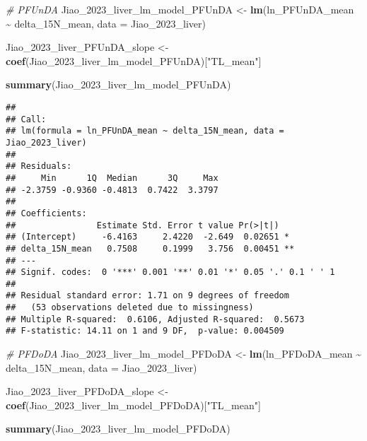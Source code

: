 \documentclass[
]{article}
\newenvironment{Shaded}{\begin{snugshade}}{\end{snugshade}}
\newcommand{\AttributeTok}[1]{\textcolor[rgb]{0.13,0.29,0.53}{#1}}
\newcommand{\CommentTok}[1]{\textcolor[rgb]{0.56,0.35,0.01}{\textit{#1}}}
\newcommand{\FunctionTok}[1]{\textcolor[rgb]{0.13,0.29,0.53}{\textbf{#1}}}
\newcommand{\NormalTok}[1]{#1}
\newcommand{\OtherTok}[1]{\textcolor[rgb]{0.56,0.35,0.01}{#1}}
\newcommand{\SpecialCharTok}[1]{\textcolor[rgb]{0.81,0.36,0.00}{\textbf{#1}}}
\newcommand{\StringTok}[1]{\textcolor[rgb]{0.31,0.60,0.02}{#1}}
\begin{document}
\begin{Shaded}
\begin{Highlighting}[]
\CommentTok{\# PFUnDA}
\NormalTok{Jiao\_2023\_liver\_lm\_model\_PFUnDA }\OtherTok{\textless{}{-}} \FunctionTok{lm}\NormalTok{(ln\_PFUnDA\_mean }\SpecialCharTok{\textasciitilde{}}\NormalTok{ delta\_15N\_mean,}
                                    \AttributeTok{data =}\NormalTok{ Jiao\_2023\_liver)}

\NormalTok{Jiao\_2023\_liver\_PFUnDA\_slope }\OtherTok{\textless{}{-}} \FunctionTok{coef}\NormalTok{(Jiao\_2023\_liver\_lm\_model\_PFUnDA)[}\StringTok{"TL\_mean"}\NormalTok{]}

\FunctionTok{summary}\NormalTok{(Jiao\_2023\_liver\_lm\_model\_PFUnDA)}
\end{Highlighting}
\end{Shaded}

\begin{verbatim}
## 
## Call:
## lm(formula = ln_PFUnDA_mean ~ delta_15N_mean, data = Jiao_2023_liver)
## 
## Residuals:
##     Min      1Q  Median      3Q     Max 
## -2.3759 -0.9360 -0.4813  0.7422  3.3797 
## 
## Coefficients:
##                Estimate Std. Error t value Pr(>|t|)   
## (Intercept)     -6.4163     2.4220  -2.649  0.02651 * 
## delta_15N_mean   0.7508     0.1999   3.756  0.00451 **
## ---
## Signif. codes:  0 '***' 0.001 '**' 0.01 '*' 0.05 '.' 0.1 ' ' 1
## 
## Residual standard error: 1.71 on 9 degrees of freedom
##   (53 observations deleted due to missingness)
## Multiple R-squared:  0.6106, Adjusted R-squared:  0.5673 
## F-statistic: 14.11 on 1 and 9 DF,  p-value: 0.004509
\end{verbatim}

\begin{Shaded}
\begin{Highlighting}[]
\CommentTok{\# PFDoDA}
\NormalTok{Jiao\_2023\_liver\_lm\_model\_PFDoDA }\OtherTok{\textless{}{-}} \FunctionTok{lm}\NormalTok{(ln\_PFDoDA\_mean }\SpecialCharTok{\textasciitilde{}}\NormalTok{ delta\_15N\_mean,}
                                    \AttributeTok{data =}\NormalTok{ Jiao\_2023\_liver)}

\NormalTok{Jiao\_2023\_liver\_PFDoDA\_slope }\OtherTok{\textless{}{-}} \FunctionTok{coef}\NormalTok{(Jiao\_2023\_liver\_lm\_model\_PFDoDA)[}\StringTok{"TL\_mean"}\NormalTok{]}

\FunctionTok{summary}\NormalTok{(Jiao\_2023\_liver\_lm\_model\_PFDoDA)}
\end{Highlighting}
\end{Shaded}
\end{document}
